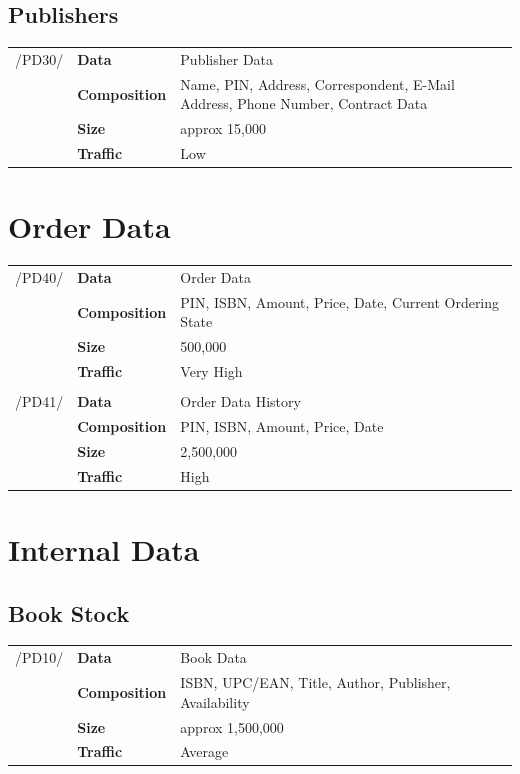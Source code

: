 \documentclass[11pt,a4paper,oneside,svgnames]{report}
\begin{document}
\subsection{Publishers}
\begin{tabular}{llp{8.75cm}}
\cellcolor{white}/PD30/	& \textbf{Data}			& Publisher Data\\
\cellcolor{white}		& \textbf{Composition}	& Name, PIN, Address, Correspondent, E-Mail Address, Phone Number, Contract Data\\
\cellcolor{white}		& \textbf{Size}		& approx 15,000\\
\cellcolor{white}		& \textbf{Traffic}		& Low\\
\end{tabular} 
\section{Order Data}
\begin{tabular}{llp{8.75cm}}
\cellcolor{white}/PD40/	& \textbf{Data}			& Order Data\\
\cellcolor{white}		& \textbf{Composition}	& PIN, ISBN, Amount, Price, Date, Current Ordering State\\
\cellcolor{white}		& \textbf{Size}		& 500,000\\
\cellcolor{white}		& \textbf{Traffic}		& Very High\\
\cellcolor{white}\hfill \\
\cellcolor{white}/PD41/	& \textbf{Data}			& Order Data History\\
\cellcolor{white}		& \textbf{Composition}	& PIN, ISBN, Amount, Price, Date\\
\cellcolor{white}		& \textbf{Size}		& 2,500,000\\
\cellcolor{white}		& \textbf{Traffic}		& High\\
\end{tabular} 
\section{Internal Data}
\subsection{Book Stock}
\begin{tabular}{llp{8.75cm}}
\cellcolor{white}/PD10/	& \textbf{Data}			& Book Data\\
\cellcolor{white}		& \textbf{Composition}	& ISBN, UPC/EAN, Title, Author, Publisher, Availability\\
\cellcolor{white}		& \textbf{Size}		& approx 1,500,000\\
\cellcolor{white}		& \textbf{Traffic}		& Average\\
\end{tabular} 
\end{document}
